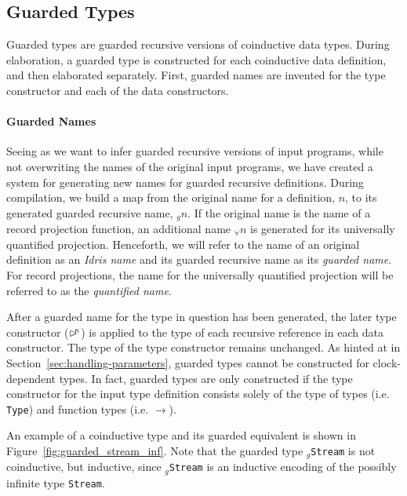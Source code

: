 
\subsection{Guarded Types}
\label{sec:guarded-types}
Guarded types are guarded recursive versions of coinductive data types. During
elaboration, a guarded type is constructed for each coinductive data definition,
and then elaborated separately. First, guarded names are invented for the type constructor and
each of the data constructors. 

\paragraph{Guarded Names}
Seeing as we want to infer guarded recursive versions of input programs, while not
overwriting the names of the original input programs, we have created a system for
generating new names for guarded recursive definitions. During compilation, we build a
map from the original name for a definition, $n$, to its generated guarded recursive name,
$_gn$. If the original name is the name of a record projection function, an
additional name $_{\forall}n$ is generated for its universally quantified
projection. Henceforth, we will refer to the name of an original definition as
an \emph{Idris name} and its guarded recursive name as its \emph{guarded name}. For
record projections, the name for the universally quantified projection will be
referred to as the \emph{quantified name}. 

After a guarded name for the type in question has been generated, the later type constructor ($\rhd^{\!\!\kappa}$)
is applied to the type of each recursive reference in each data
constructor. The type of the type constructor remains unchanged. As hinted at in
Section~\ref{sec:handling-parameters}, guarded types cannot be constructed for
clock-dependent types. In fact, guarded types are only constructed if the type
constructor for the input type definition consists solely of the type of types
(i.e. \texttt{Type}) and function types (i.e. $\to$).

An example of a
coinductive type and its guarded equivalent is shown in
Figure~\ref{fig:guarded_stream_inf}. Note that the guarded type \texttt{$_g$Stream} is not coinductive, but
inductive, since \texttt{$_g$Stream} is an inductive encoding of the
possibly infinite type \texttt{Stream}.

